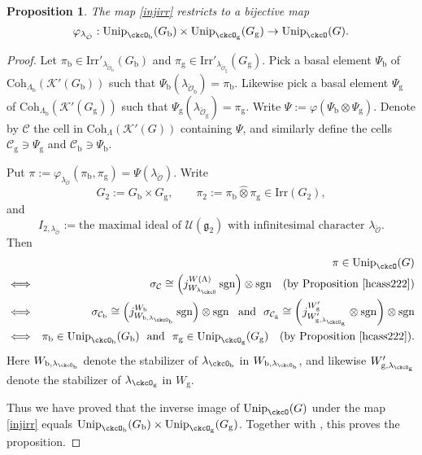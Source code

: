 \documentclass[12pt,a4paper]{amsart}
\newcommand{\CC}{{\mathcal {C}}}
\newcommand{\CK}{{\mathcal {K}}}
\newcommand{\CO}{{\mathcal {O}}}
\newcommand{\CU}{{\mathcal {U}}}
\newcommand{\sgn}{\operatorname{sgn}}
\newcommand{\g}{\mathfrak g}
\numberwithin{equation}{section}
\newtheorem{prop}[thm]{Proposition}
\theoremstyle{remark}
\def\Irr{\mathrm{Irr}}
\def\Unip{\mathrm{Unip}}
\def\Coh{\mathrm{Coh}}
\begin{document}
\begin{prop}\label{propKL333}
The map  \eqref{injirr} restricts to a bijective map
\[
    \varphi_{\lambda_{\check \CO}}: \Unip_{\ckcO_{\mathrm b}}(G_{\mathrm b})\times \Unip_{\ckcO_{\mathrm g}}(G_{\mathrm g})\rightarrow \Unip_{\ckcO}(G).
    \]

\end{prop}
\begin{proof}
Let $\pi_\mathrm b\in  \Irr'_{\lambda_{\check \CO_\mathrm b}}(G_\mathrm b)$ and $\pi_\mathrm g\in  \Irr'_{\lambda_{\check \CO_\mathrm g}}(G_\mathrm g)$.  Pick a basal  element $\Psi_\mathrm b$ of  $\Coh_{ \Lambda_\mathrm b}(\CK'(G_\mathrm b))$ such that $\Psi_\mathrm b(\lambda_{\check \CO_\mathrm b})=\pi_\mathrm b$. Likewise pick a basal  element $\Psi_\mathrm g$ of $ \Coh_{ \Lambda_\mathrm b}(\CK'(G_\mathrm g))$ such that $\Psi_\mathrm g(\lambda_{\check \CO_\mathrm g})=\pi_\mathrm g$.
Write $\Psi:=\varphi(\Psi_\mathrm b\otimes \Psi_\mathrm g)$. Denote by $\CC$ the cell in $ \Coh_{\Lambda}(\CK'(G))$ containing $\Psi$, and similarly define the
 cells $\CC_\mathrm g\ni \Psi_{\mathrm g}$ and $\CC_\mathrm b\ni \Psi_{\mathrm b}$.

Put $\pi:= \varphi_{\lambda_{\check \CO}}(\pi_\mathrm b, \pi_\mathrm g)=\Psi(\lambda_{\check \CO})$. Write
\[
  G_2:=G_\mathrm b \times G_\mathrm g, \qquad \pi_2:=\pi_\mathrm b\widehat \otimes \pi_\mathrm g\in \Irr(G_2),
  \]
  and
  \[
   I_{2, \lambda_{\check \CO}}:=\textrm{the maximal ideal of $\CU(\g_2)$ with infinitesimal character $\lambda_{\check \CO}$.}
  \]
Then
 \begin{eqnarray*}
   && \pi\in  \Unip_{\ckcO}(G)\\
    &\Longleftrightarrow& \sigma_\CC\cong  \left( j_{W_{\lambda_\ckcO}}^{W(\Lambda)} \sgn\right)\otimes \sgn \quad (\textrm{by Proposition \ref{hcass222}})\\
   &\Longleftrightarrow& \sigma_{\CC_\mathrm b}\cong  \left( j_{W_{\mathrm b, \lambda_{\ckcO_\mathrm b}}}^{W_\mathrm b} \sgn\right)\otimes \sgn \ \ \textrm{and}\ \  \sigma_{\CC_\mathrm g}\cong  \left( j_{W'_{\mathrm g, \lambda_{\ckcO_\mathrm g}}}^{W'_\mathrm g} \otimes \sgn\right)\otimes \sgn\\
 &\Longleftrightarrow& \pi_\mathrm b\in  \Unip_{\ckcO_{\mathrm b}}(G_{\mathrm b}) \ \ \textrm{and}\ \  \pi_\mathrm g\in  \Unip_{\ckcO_{\mathrm g}}(G_{\mathrm g}) \quad (\textrm{by Proposition \ref{hcass222}}).
 \end{eqnarray*}
 Here $W_{\mathrm b, \lambda_{\ckcO_\mathrm b}}$ denote the stabilizer of $\lambda_{\ckcO_\mathrm b}$ in $W_{\mathrm b, \lambda_{\ckcO_\mathrm b}}$, and likewise $W'_{\mathrm g, \lambda_{\ckcO_\mathrm g}}$ denote the stabilizer of $\lambda_{\ckcO_\mathrm g}$ in $W_{\mathrm g}$.

 Thus we have proved that the inverse image of $\Unip_{\ckcO}(G)$ under the map \eqref{injirr} equals  $\Unip_{\ckcO_{\mathrm b}}(G_{\mathrm b})\times \Unip_{\ckcO_{\mathrm g}}(G_{\mathrm g})$. Together with ,  this proves the proposition. \end{proof}
\end{document}
